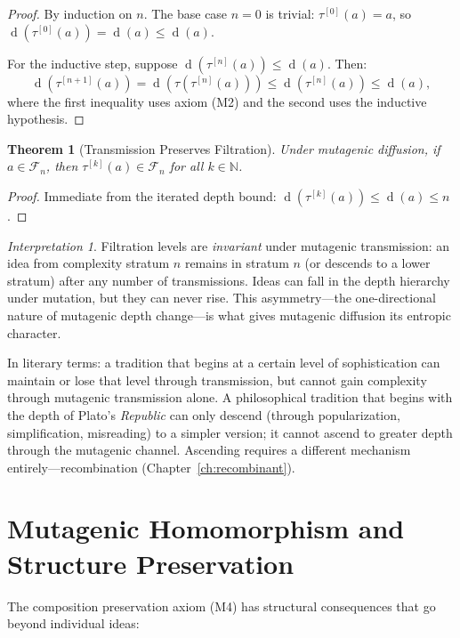 \documentclass[11pt,openany]{book}
\theoremstyle{definition}
\theoremstyle{plain}
\newtheorem{theorem}[axiom]{Theorem}
\theoremstyle{remark}
\newtheorem{interpretation}[axiom]{Interpretation}
\newcommand{\depth}{\operatorname{d}}       %
\newcommand{\transmit}{\tau}                 %
\newcommand{\Filt}[1]{\mathcal{F}_{#1}}     %
\begin{document}
\begin{proof}
By induction on $n$. The base case $n = 0$ is trivial: $\transmit^{[0]}(a) = a$, so $\depth(\transmit^{[0]}(a)) = \depth(a) \leq \depth(a)$.

For the inductive step, suppose $\depth(\transmit^{[n]}(a)) \leq \depth(a)$. Then:
\[
\depth(\transmit^{[n+1]}(a)) = \depth(\transmit(\transmit^{[n]}(a))) \leq \depth(\transmit^{[n]}(a)) \leq \depth(a),
\]
where the first inequality uses axiom (M2) and the second uses the inductive hypothesis.
\end{proof}

\begin{theorem}[Transmission Preserves Filtration]
Under mutagenic diffusion, if $a \in \Filt{n}$, then $\transmit^{[k]}(a) \in \Filt{n}$ for all $k \in \mathbb{N}$.
\end{theorem}

\begin{proof}
Immediate from the iterated depth bound: $\depth(\transmit^{[k]}(a)) \leq \depth(a) \leq n$.
\end{proof}

\begin{interpretation}
Filtration levels are \emph{invariant} under mutagenic transmission: an idea from complexity stratum $n$ remains in stratum $n$ (or descends to a lower stratum) after any number of transmissions. Ideas can fall in the depth hierarchy under mutation, but they can never rise. This asymmetry---the one-directional nature of mutagenic depth change---is what gives mutagenic diffusion its entropic character.

In literary terms: a tradition that begins at a certain level of sophistication can maintain or lose that level through transmission, but cannot gain complexity through mutagenic transmission alone. A philosophical tradition that begins with the depth of Plato's \emph{Republic} can only descend (through popularization, simplification, misreading) to a simpler version; it cannot ascend to greater depth through the mutagenic channel. Ascending requires a different mechanism entirely---recombination (Chapter~\ref{ch:recombinant}).
\end{interpretation}

\section{Mutagenic Homomorphism and Structure Preservation}

The composition preservation axiom (M4) has structural consequences that go beyond individual ideas:
\end{document}
